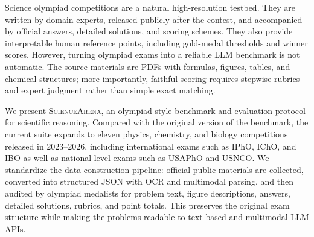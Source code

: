 \documentclass[11pt]{article}
\begin{document}
Science olympiad competitions are a natural high-resolution testbed.
They are written by domain experts, released publicly after the contest, and accompanied by official answers, detailed solutions, and scoring schemes.
They also provide interpretable human reference points, including gold-medal thresholds and winner scores.
However, turning olympiad exams into a reliable LLM benchmark is not automatic.
The source materials are PDFs with formulas, figures, tables, and chemical structures; more importantly, faithful scoring requires stepwise rubrics and expert judgment rather than simple exact matching.


We present \textsc{ScienceArena}, an olympiad-style benchmark and evaluation protocol for scientific reasoning.
Compared with the original version of the benchmark, the current suite expands to eleven physics, chemistry, and biology competitions released in 2023--2026, including international exams such as IPhO, IChO, and IBO as well as national-level exams such as USAPhO and USNCO.
We standardize the data construction pipeline: official public materials are collected, converted into structured JSON with OCR and multimodal parsing, and then audited by olympiad medalists for problem text, figure descriptions, answers, detailed solutions, rubrics, and point totals.
This preserves the original exam structure while making the problems readable to text-based and multimodal LLM APIs.
\end{document}
